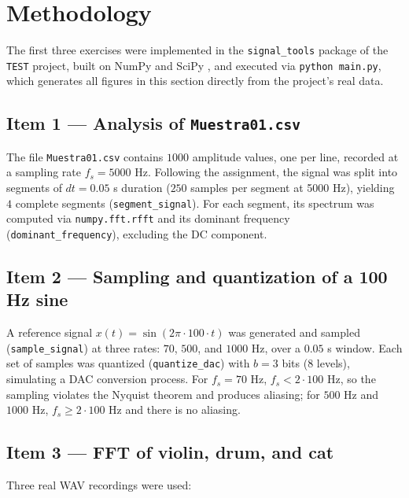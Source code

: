 
\section{Methodology}

The first three exercises were implemented in the \texttt{signal\_tools} package of the \texttt{TEST} project, built on NumPy and SciPy \cite{numpy, scipy}, and executed via \texttt{python main.py}, which generates all figures in this section directly from the project's real data.

\subsection{Item 1 — Analysis of \texttt{Muestra01.csv}}

The file \texttt{Muestra01.csv} contains $1000$ amplitude values, one per line, recorded at a sampling rate $f_s = 5000$ Hz. Following the assignment, the signal was split into segments of $dt = 0.05$ s duration ($250$ samples per segment at 5000 Hz), yielding $4$ complete segments (\texttt{segment\_signal}). For each segment, its spectrum was computed via \texttt{numpy.fft.rfft} and its dominant frequency (\texttt{dominant\_frequency}), excluding the DC component.

\subsection{Item 2 — Sampling and quantization of a 100 Hz sine}

A reference signal $x(t) = \sin(2\pi \cdot 100 \cdot t)$ was generated and sampled (\texttt{sample\_signal}) at three rates: $70$, $500$, and $1000$ Hz, over a $0.05$ s window. Each set of samples was quantized (\texttt{quantize\_dac}) with $b=3$ bits ($8$ levels), simulating a DAC conversion process. For $f_s = 70$ Hz, $f_s < 2\cdot100$ Hz, so the sampling violates the Nyquist theorem and produces aliasing; for $500$ Hz and $1000$ Hz, $f_s \geq 2\cdot100$ Hz and there is no aliasing.

\subsection{Item 3 — FFT of violin, drum, and cat}

Three real WAV recordings were used:

